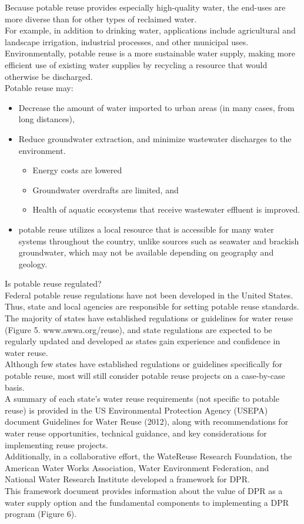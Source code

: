 \documentclass{article}
\begin{document}
Because potable reuse provides especially high-quality water, the end-uses are more diverse than for other types of reclaimed water. \\
For example, in addition to drinking water, applications include agricultural and landscape irrigation, industrial processes, and other municipal uses. \\
Environmentally, potable reuse is a more sustainable water supply, making more efficient use of existing water supplies by recycling a resource that would otherwise be discharged.\\
Potable reuse may:
\begin{itemize}
\item  Decrease the amount of water imported to urban areas (in many cases, from long distances), 
\item Reduce groundwater extraction, and minimize wastewater discharges to the environment. \\
\begin{itemize}
\item Energy costs are lowered
\item Groundwater overdrafts are limited, and 
\item Health of aquatic ecosystems that receive wastewater effluent is improved.
\end{itemize}
\item potable reuse utilizes a local resource that is accessible for many water systems throughout the country, unlike sources such as seawater and brackish groundwater, which may not be available depending on geography and geology.
\end{itemize}
Is potable reuse regulated?\\
Federal potable reuse regulations have not been developed in the United States. \\
Thus, state and local agencies are responsible for setting potable reuse standards. The majority of states have established regulations or guidelines for water reuse (Figure 5. www.awwa.org/reuse), and state regulations are expected to be regularly updated and developed as states gain experience and confidence in water reuse. \\
Although few states have established regulations or guidelines specifically for potable reuse, most will still consider potable reuse projects on a case-by-case basis. \\
A summary of each state’s water reuse requirements (not specific to potable reuse) is provided in the US Environmental Protection Agency (USEPA) document Guidelines for Water Reuse (2012), along with recommendations for water reuse opportunities, technical guidance, and key considerations for implementing reuse projects.\\
Additionally, in a collaborative effort, the WateReuse Research Foundation, the American Water Works Association, Water Environment Federation, and National Water Research Institute developed a framework for DPR.\\
This framework document provides information about the value of DPR as a water supply option and the fundamental components to implementing a DPR program (Figure 6).\\
\end{document}
